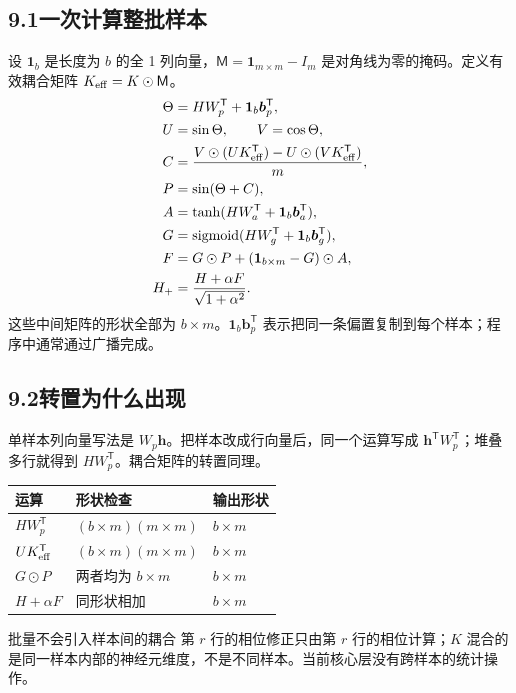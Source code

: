 \documentclass[UTF8,11pt,a4paper,fontset=fandol]{ctexart}
\newcommand{\sig}{\operatorname{sigmoid}}
\begin{document}
\subsection*{9.1\quad 一次计算整批样本}
设 $\boldsymbol{1}_b$ 是长度为 $b$ 的全 1 列向量，$\mathsf{M}=\boldsymbol{1}_{m\times m}-I_m$ 是对角线为零的掩码。定义有效耦合矩阵 $K_{\rm eff}=K\odot\mathsf{M}$。
\begin{align}
\Theta &= H W_p^{\mathsf T}+\boldsymbol{1}_b\boldsymbol{b}_p^{\mathsf T},\notag\\
U&=\sin\Theta,\qquad V=\cos\Theta,\notag\\
C&=\frac{V\odot(U K_{\rm eff}^{\mathsf T})-U\odot(V K_{\rm eff}^{\mathsf T})}{m},\notag\\
P&=\sin(\Theta+C),\notag\\
A&=\tanh(H W_a^{\mathsf T}+\boldsymbol{1}_b\boldsymbol{b}_a^{\mathsf T}),\notag\\
G&=\sig(H W_g^{\mathsf T}+\boldsymbol{1}_b\boldsymbol{b}_g^{\mathsf T}),\notag\\
F&=G\odot P+(\boldsymbol{1}_{b\times m}-G)\odot A,\notag\\
H_+&=\frac{H+\alpha F}{\sqrt{1+\alpha^2}}.\label{eq:batch}
\end{align}
这些中间矩阵的形状全部为 $b\times m$。$\boldsymbol{1}_b\boldsymbol{b}_p^{\mathsf T}$ 表示把同一条偏置复制到每个样本；程序中通常通过广播完成。
\subsection*{9.2\quad 转置为什么出现}
单样本列向量写法是 $W_p\boldsymbol{h}$。把样本改成行向量后，同一个运算写成 $\boldsymbol{h}^{\mathsf T}W_p^{\mathsf T}$；堆叠多行就得到 $HW_p^{\mathsf T}$。耦合矩阵的转置同理。
\par\smallskip\noindent\begin{tabularx}{\linewidth}{@{}p{53mm}p{39mm}Y@{}}
\toprule
运算&形状检查&输出形状\\\midrule
$H W_p^{\mathsf T}$&$(b\times m)(m\times m)$&$b\times m$\\
$U K_{\rm eff}^{\mathsf T}$&$(b\times m)(m\times m)$&$b\times m$\\
$G\odot P$&两者均为 $b\times m$&$b\times m$\\
$H+\alpha F$&同形状相加&$b\times m$\\\bottomrule
\end{tabularx}\par\smallskip
\begin{explain}{批量不会引入样本间的耦合}
第 $r$ 行的相位修正只由第 $r$ 行的相位计算；$K$ 混合的是同一样本内部的神经元维度，不是不同样本。当前核心层没有跨样本的统计操作。
\end{explain}
\end{document}
